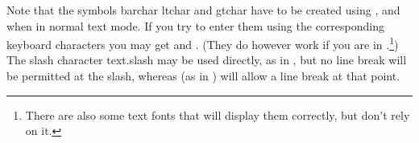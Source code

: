 Note that the symbols \gls{barchar} \gls{ltchar} and \gls{gtchar} have to
be created using ,  and
 when in normal text mode. If you try to enter
them using the corresponding keyboard characters you may get
  and . (They do however work if you are in
.\footnote{There are also some text
fonts that will display them correctly, but don't rely on it.}) The
slash character \gls{text.slash} may be used directly, as in
, but no line break will be permitted at the slash,
whereas  (as in ) will allow a
line break at that point.

